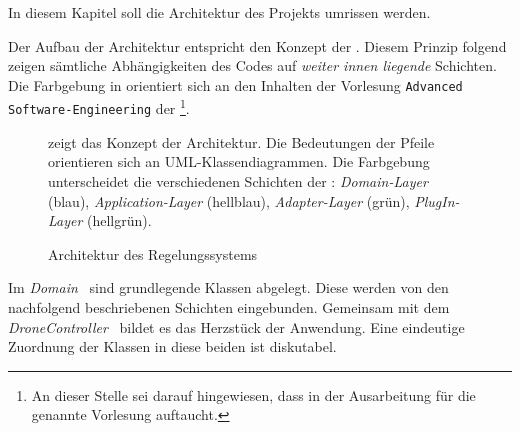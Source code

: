 In diesem Kapitel soll die Architektur des Projekts umrissen werden. 


Der Aufbau der Architektur entspricht den Konzept der \clean. Diesem Prinzip folgend zeigen sämtliche Abhängigkeiten des Codes auf \textit{weiter innen liegende} Schichten.
Die Farbgebung in  orientiert sich an den Inhalten der Vorlesung \texttt{Advanced Software-Engineering} der \DHBW\footnote{An dieser Stelle sei darauf hingewiesen, dass  in der Ausarbeitung für die genannte Vorlesung auftaucht.}.

\begin{figure}[ht!]
\vspace{0.25cm}
\begin{center}
\caption{Architektur des Regelungssystems}
\label{fig:Packs}
\end{center}

\vspace{0.25cm}
 zeigt das Konzept der Architektur. Die Bedeutungen der Pfeile orientieren sich an UML-Klassendiagrammen. Die Farbgebung unterscheidet die verschiedenen Schichten der \clean: \textit{Domain-Layer} (blau), \textit{Application-Layer} (hellblau), \textit{Adapter-Layer} (grün), \textit{PlugIn-Layer} (hellgrün).
\end{figure}



Im \textit{Domain} \Pack\ sind grundlegende Klassen abgelegt. Diese werden von den nachfolgend beschriebenen Schichten eingebunden. Gemeinsam mit dem \textit{DroneController} \Pack\ bildet es das Herzstück der Anwendung. Eine eindeutige Zuordnung der Klassen in diese beiden \Pack[s] ist diskutabel.


